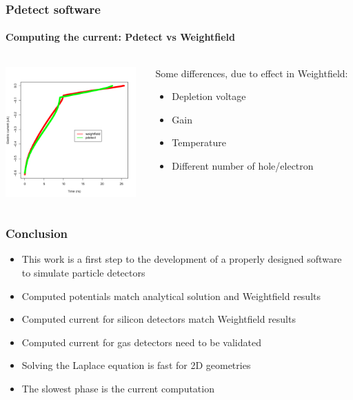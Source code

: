 \documentclass[14pt]{beamer}
\begin{document}
\begin{frame}
  \frametitle{Pdetect software}
  \framesubtitle{Computing the current: Pdetect vs Weightfield}

  \begin{columns}
    \begin{column}{0.5\textwidth}

      \begin{center}
        \includegraphics[width=5cm]{images/silicon_current.pdf}
      \end{center}
    \end{column}

    \begin{column}{0.5\textwidth}
      \fontsize{12pt}{9}\selectfont

      Some differences, due to effect in Weightfield:
      \begin{itemize}
        \item Depletion voltage
        \item Gain
        \item Temperature
        \item Different number of hole/electron
      \end{itemize}

    \end{column}
  \end{columns}
\end{frame}

\begin{frame}
  \frametitle{Conclusion}

  \fontsize{13pt}{7.2}\selectfont


\begin{itemize}
  \item This work is a first step to the development of a properly designed
	software to simulate particle detectors
  \item Computed potentials match analytical solution and Weightfield results
  \item Computed current for silicon detectors match Weightfield results
  \item Computed current for gas detectors need to be validated
  \item Solving the Laplace equation is fast for 2D geometries
  \item The slowest phase is the current computation
\end{itemize}


\end{frame}
\end{document}
